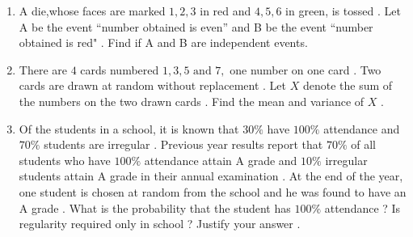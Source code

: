 \begin{enumerate}
\item A die,whose faces are marked  $1, 2, 3 $ in red and $4,5,6 $ in green, is tossed . Let A be the event “number obtained is even” and B be the event “number obtained is red" . Find if A and B are independent events.
\item There are $4$ cards numbered $1, 3, 5 \text{ and }  7,$  one number on one card . Two cards are drawn at random without replacement . Let $X$ denote the sum of the numbers on the two drawn cards . Find the mean and variance of $X$ .
\item Of the students in a school, it is known that $30\%$ have $100\%$ attendance and $70\%$ students are irregular . Previous year results report that $70\%$ of all students who have $100\%$ attendance attain A grade and $10\%$ irregular students attain A grade in their annual examination . At the end of the year, one student is chosen at random from the school and he was found to have an A grade . What is the probability that the student has $100\%$ attendance ? Is regularity required only in school ? Justify your answer .
\end{enumerate}
